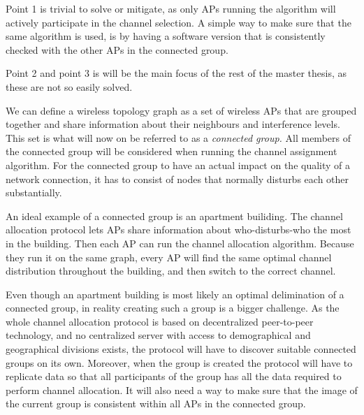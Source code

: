    Point 1 is trivial to solve or mitigate, as only APs running the algorithm will actively participate in the channel selection. A simple way to make sure that the
   same algorithm is used, is by having a software version that is consistently checked with the other APs in the connected group.

   Point 2 and point 3 is will be the main focus of the rest of the master thesis, as these are not so easily solved.

   We can define a wireless topology graph as a set of wireless APs that are grouped together and share information about their neighbours and interference levels.
   This set is what will now on be referred to as a \textit{connected group.} All members of the connected group will be considered when running the channel assignment algorithm.
   For the connected group to have an actual impact on the quality of a network connection, it has to consist of nodes that normally disturbs each other substantially.

   An ideal example of a connected group is an apartment builiding. The channel allocation protocol lets APs share information about who-disturbs-who the most in the building.
   Then each AP can run the channel allocation algorithm. Because they run it on the same graph, every AP will find the same optimal channel distribution throughout the building,
   and then switch to the correct channel. 

   Even though an apartment building is most likely an optimal delimination of a connected group, in reality creating such a group is a bigger challenge. As the whole channel allocation
   protocol is based on decentralized peer-to-peer technology, and no centralized server with access to demographical and geographical divisions exists, the protocol will
   have to discover suitable connected groups on its own. Moreover, when the group is created the protocol will have to replicate data so that
   all participants of the group has all the data required to perform channel allocation. It will also need a way to make sure that the image of the current group
   is consistent within all APs in the connected group. 


